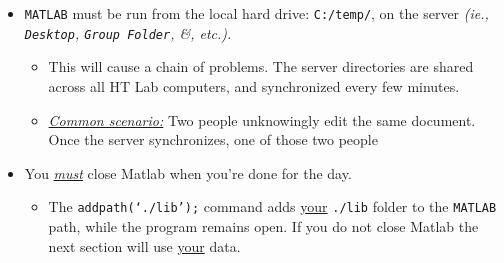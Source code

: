 \documentclass[11pt, letterpaper]{article}
\begin{document}
\begin{itemize}
    

\item \texttt{MATLAB} must be run from the local hard drive: \texttt{C:/temp/},  on the server \textit{(ie., \texttt{Desktop}, \texttt{Group Folder}, \&, etc.).} 
    \begin{itemize}
    \setlength\itemsep{0.5em}
         \item {} This will cause a chain of problems. The server directories are shared across all HT Lab computers, and synchronized every few minutes. 
         \item \textit{\ul{Common scenario:}} Two people unknowingly edit the same document. Once the server synchronizes, one of those two people 
    \end{itemize}

    \item You \textit{\ul{must}} close Matlab when you're done for the day.
    \begin{itemize}
    \setlength\itemsep{0.5em}
         \item {} The \texttt{addpath(`./lib');} command adds \ul{your} \texttt{./lib} folder to the \texttt{MATLAB} path, while the program remains open. If you do not close Matlab the next section will use \ul{your} data.
    \end{itemize}
    
\end{itemize}
\end{document}
